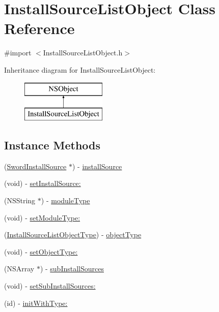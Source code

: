\hypertarget{interface_install_source_list_object}{\section{Install\-Source\-List\-Object Class Reference}
\label{interface_install_source_list_object}
}


{\ttfamily \#import $<$Install\-Source\-List\-Object.\-h$>$}

Inheritance diagram for Install\-Source\-List\-Object\-:\begin{figure}[H]
\begin{center}
\leavevmode
\includegraphics[height=2.000000cm]{interface_install_source_list_object}
\end{center}
\end{figure}
\subsection*{Instance Methods}
\begin{DoxyCompactItemize}
\item 
(\hyperlink{interface_sword_install_source}{Sword\-Install\-Source} $\ast$) -\/ \hyperlink{interface_install_source_list_object_afe3a4daa2c93ed90f23af0c6ba8def8e}{install\-Source}
\item 
(void) -\/ \hyperlink{interface_install_source_list_object_af68ecc4c461c8204d559124bc53fafb0}{set\-Install\-Source\-:}
\item 
(N\-S\-String $\ast$) -\/ \hyperlink{interface_install_source_list_object_a49a22e3cf869838dea4db3178ccf38c4}{module\-Type}
\item 
(void) -\/ \hyperlink{interface_install_source_list_object_a87095f84fb525742b6bec42deada3a14}{set\-Module\-Type\-:}
\item 
(\hyperlink{_install_source_list_object_8h_ac68106c51c20429f37576f8715a786e2}{Install\-Source\-List\-Object\-Type}) -\/ \hyperlink{interface_install_source_list_object_affc723d95d7f3409c1640dc4d2d4802e}{object\-Type}
\item 
(void) -\/ \hyperlink{interface_install_source_list_object_a86b1b5d981b8c1f9df42eb604f275037}{set\-Object\-Type\-:}
\item 
(N\-S\-Array $\ast$) -\/ \hyperlink{interface_install_source_list_object_a28f4a0715f73e242b8fc87148c07309c}{sub\-Install\-Sources}
\item 
(void) -\/ \hyperlink{interface_install_source_list_object_a7a8eb9912a595b76ee0ecb5ff1b31aea}{set\-Sub\-Install\-Sources\-:}
\item 
(id) -\/ \hyperlink{interface_install_source_list_object_aea88a1797b6142243c39c216fa0e11eb}{init\-With\-Type\-:}
\end{DoxyCompactItemize}
